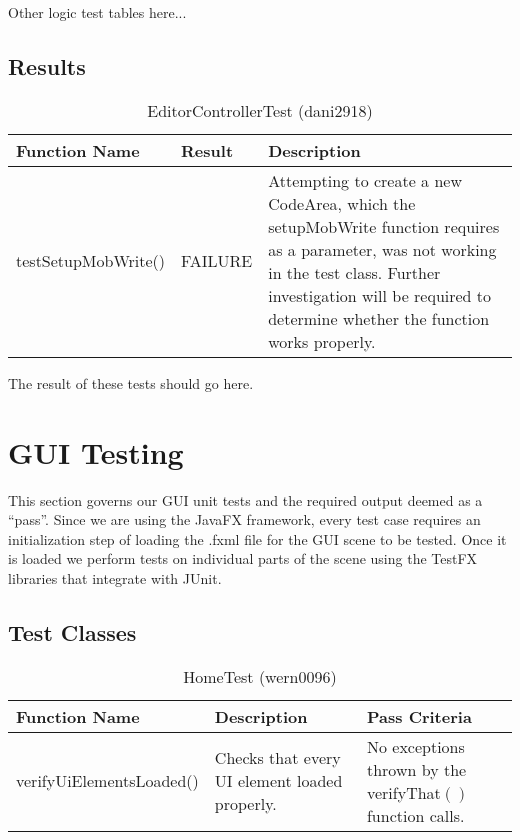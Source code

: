 \documentclass[14pt, a4paper]{article}
\begin{document}
Other logic test tables here...

\newpage

\subsection{Results}


\begin{table}[h]
	\centering	
	\caption{EditorControllerTest (dani2918)}
	\begin{tabular}{|p{3cm}|p{3cm}|p{9cm}|} 
		\hline
		\textbf{Function Name} & \textbf{Result} & \textbf{Description}  \\\hline
		testSetupMobWrite() & FAILURE & Attempting to create a new CodeArea, which the setupMobWrite function requires as a parameter, was not working in the test class. Further investigation will be required to determine whether the function works properly.
		  \\\hline
	\end{tabular}
\end{table}
The result of these tests should go here.

\newpage

\section{GUI Testing}

This section governs our GUI unit tests and the required output deemed as a ``pass''. Since we are using the JavaFX framework, every test case requires an initialization step of loading the .fxml file for the GUI scene to be tested. Once it is loaded we perform tests on individual parts of the scene using the TestFX libraries that integrate with JUnit.

\subsection{Test Classes}

\begin{table}[h]
	\centering	
	\caption{HomeTest (wern0096)}
	\begin{tabular}{|p{4cm}|p{5cm}|p{6cm}|} 
		\hline
		\textbf{Function Name} & \textbf{Description} & \textbf{Pass Criteria}  \\\hline
		verifyUiElementsLoaded() & Checks that every UI element loaded properly. & No exceptions thrown by the verifyThat$\left(\right)$ function calls. \\\hline
	\end{tabular}
\end{table}
\end{document}
